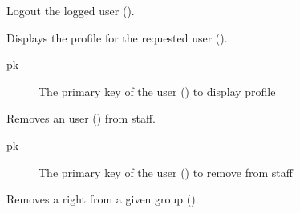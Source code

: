 \documentclass[letterpaper,10pt,english]{sphinxmanual}
\begin{document}
\begin{fulllineitems}
\label{\detokenize{modules/views:users.views.logoutView}}
Logout the logged user ().

\end{fulllineitems}


\begin{fulllineitems}
\label{\detokenize{modules/views:users.views.profile}}
Displays the profile for the requested user ().
\begin{description}
\item[{pk}] \leavevmode
The primary key of the user () to display profile

\end{description}

\end{fulllineitems}


\begin{fulllineitems}
\label{\detokenize{modules/views:users.views.removeAdmin}}
Removes an user () from staff.
\begin{description}
\item[{pk}] \leavevmode
The primary key of the user () to remove from staff

\end{description}

\end{fulllineitems}


\begin{fulllineitems}
\label{\detokenize{modules/views:users.views.removeRight}}
Removes a right from a given group ().

\end{fulllineitems}
\end{document}
